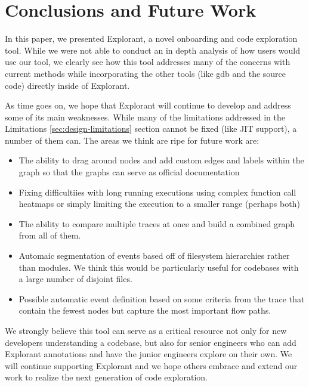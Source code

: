 \chapter{Conclusions and Future Work}
In this paper, we presented Explorant, a novel onboarding and code exploration tool. While we were not able to conduct an in depth analysis of how users would use our tool, we clearly see how this tool addresses many of the concerns with current methods while incorporating the other tools (like gdb and the source code) directly inside of Explorant. 

As time goes on, we hope that Explorant will continue to develop and address some of its main weaknesses. While many of the limitations addressed in the Limitations \ref{sec:design-limitations} section cannot be fixed (like JIT support), a number of them can. The areas we think are ripe for future work are:
\begin{itemize}
\item The ability to drag around nodes and add custom edges and labels within the graph so that the graphs can serve as official documentation
\item Fixing difficultiies with long running executions using complex function call heatmaps or simply limiting the execution to a smaller range (perhaps both) 
\item The ability to compare multiple traces at once and build a combined graph from all of them.
\item Automaic segmentation of events based off of filesystem hierarchies rather than modules. We think this would be particularly useful for codebases with a large number of disjoint files.
\item Possible automatic event definition based on some criteria from the trace that contain the fewest nodes but capture the most important flow paths. 
\end{itemize}

We strongly believe this tool can serve as a critical resource not only for new developers understanding a codebase, but also for senior engineers who can add Explorant annotations and have the junior engineers explore on their own. We will continue supporting Explorant and we hope others embrace and extend our work to realize the next generation of code exploration.

